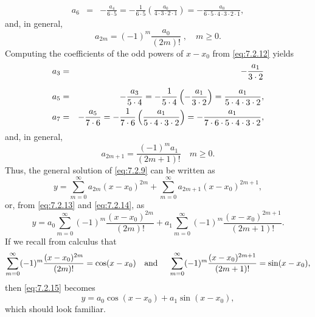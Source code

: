 \begin{examplesolution}
\begin{eqnarray*}
  a_{6} & = & -\frac{a_{4}}{6\cdot5}=-\frac{1}{6\cdot5}\left(\frac{a_{0}}{4\cdot3\cdot2\cdot1}\right)=-\frac{a_{0}}{6\cdot5\cdot4\cdot3\cdot2\cdot1},
\end{eqnarray*}
and, in general,
\begin{equation}
  \label{eq:7.2.13}a_{2m}=(-1)^{m}\frac{a_{0}}{(2m)!}\;,\quad m\ge0.
\end{equation}
Computing the coefficients of the odd powers of $x-x_{0}$ from \eqref{eq:7.2.12} yields
\begin{eqnarray*}
  a_{3} & = & -\frac{a_{1}}{3\cdot2}                                                                                          \\[2\jot]
  a_{5} & = & -\frac{a_{3}}{5\cdot4}=-\frac{1}{5\cdot4}\left(-\frac{a_{1}}{3\cdot2}\right)=\frac{a_{1}}{5\cdot4\cdot3\cdot2}, \\
  a_{7} & = & -\frac{a_{5}}{7\cdot6}=-\frac{1}{7\cdot6}\left(\frac{a_{1}}{5\cdot4\cdot3\cdot2}\right)=-\frac{a_{1}}{7\cdot6\cdot5\cdot4\cdot3\cdot2},
\end{eqnarray*}
and, in general,
\begin{equation}
  \label{eq:7.2.14}a_{2m+1}=\frac{(-1)^{m}a_{1}}{(2m+1)!}\quad m\ge0.
\end{equation}
Thus, the general solution of \eqref{eq:7.2.9} can be written as
\[
  y=\sum_{m=0}^{\infty}a_{2m}(x-x_{0})^{2m}+\sum_{m=0}^{\infty}a_{2m+1}(x-x_{0})^{2m+1},
\]
or, from \eqref{eq:7.2.13} and \eqref{eq:7.2.14}, as
\begin{equation}
  \label{eq:7.2.15}y=a_{0}\sum_{m=0}^{\infty}(-1)^{m}\frac{(x-x_{0})^{2m}}{(2m)!}+a_{1}\sum_{m=0}^{\infty}(-1)^{m}\frac{(x-x_{0})^{2m+1}}{(2m+1)!}.
\end{equation}
If we recall from calculus that
\[
  \sum_{m=0}^{\infty}(-1)^{m}\frac{(x-x_{0})^{2m}}{(2m)!}=\cos(x-x_{0}) \mbox{\quad and \quad }\sum_{m=0}^{\infty}(-1)^{m}\frac{(x-x_{0})^{2m+1}}{(2m+1)!}=\sin(x-x_{0}),
\]
then \eqref{eq:7.2.15} becomes
\[
  y=a_{0}\cos(x-x_{0})+a_{1}\sin(x-x_{0}),
\]
which should look familiar. \bbox
\end{examplesolution}

